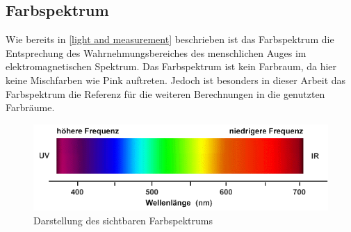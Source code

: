 \documentclass[11pt]{scrartcl}
\begin{document}
\subsection{Farbspektrum}
Wie bereits in \ref{light and measurement} beschrieben ist das Farbspektrum die Entsprechung des Wahrnehmungsbereiches des menschlichen
Auges im elektromagnetischen Spektrum. Das Farbspektrum ist kein Farbraum, da hier keine Mischfarben wie Pink auftreten. Jedoch ist besonders
in dieser Arbeit das Farbspektrum die Referenz für die weiteren Berechnungen in die genutzten Farbräume.
\begin{figure}[H]
    \includegraphics[width=\textwidth]{images/farbspektrum.png}
    \caption{Darstellung des sichtbaren Farbspektrums \cite{fhtEsslignen}}
\end{figure}
\noindent
\end{document}
